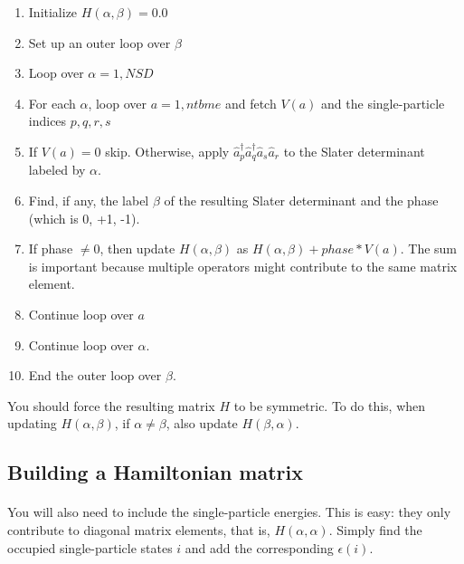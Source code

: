 \begin{enumerate}
\item Initialize $H(\alpha,\beta)=0.0$

\item Set up an outer loop over $\beta$

\item Loop over $\alpha = 1, NSD$

\item For each $\alpha$, loop over $a=1,ntbme$  and fetch $V(a)$ and the single-particle indices $p,q,r,s$ 

\item If $V(a) = 0$ skip.  Otherwise, apply $\hat{a}^\dagger_p\hat{a}^\dagger_q \hat{a}_s \hat{a}_r$ to the Slater determinant labeled by $\alpha$.

\item Find, if any, the label $\beta$ of the resulting Slater determinant and the phase (which is 0, +1, -1).

\item If phase $\neq 0$, then update $H(\alpha,\beta)$  as $H(\alpha,\beta) + phase*V(a)$. The sum is important because multiple operators might contribute to the same matrix element.

\item Continue loop over $a$

\item Continue loop over $\alpha$.

\item End the outer loop over $\beta$.
\end{enumerate}

\noindent
You should force the resulting matrix $H$ to be symmetric. To do this, when
updating $H(\alpha,\beta)$, if $\alpha \neq \beta$, also update $H(\beta,\alpha)$.



\subsection*{Building a Hamiltonian matrix}

\paragraph{}

You will also need to include the single-particle energies. This is easy: they only
contribute to diagonal matrix elements, that is, $H(\alpha,\alpha)$.  
Simply find the occupied single-particle states $i$ and add the corresponding $\epsilon(i)$.



